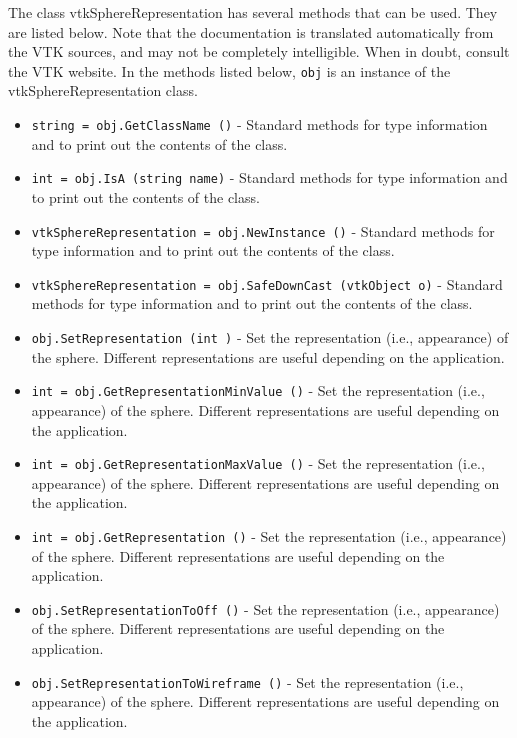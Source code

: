 The class vtkSphereRepresentation has several methods that can be used.
  They are listed below.
Note that the documentation is translated automatically from the VTK sources,
and may not be completely intelligible.  When in doubt, consult the VTK website.
In the methods listed below, \verb|obj| is an instance of the vtkSphereRepresentation class.
\begin{itemize}
\item  \verb|string = obj.GetClassName ()| -  Standard methods for type information and to print out the contents of the class.

\item  \verb|int = obj.IsA (string name)| -  Standard methods for type information and to print out the contents of the class.

\item  \verb|vtkSphereRepresentation = obj.NewInstance ()| -  Standard methods for type information and to print out the contents of the class.

\item  \verb|vtkSphereRepresentation = obj.SafeDownCast (vtkObject o)| -  Standard methods for type information and to print out the contents of the class.

\item  \verb|obj.SetRepresentation (int )| -  Set the representation (i.e., appearance) of the sphere. Different
 representations are useful depending on the application. 

\item  \verb|int = obj.GetRepresentationMinValue ()| -  Set the representation (i.e., appearance) of the sphere. Different
 representations are useful depending on the application. 

\item  \verb|int = obj.GetRepresentationMaxValue ()| -  Set the representation (i.e., appearance) of the sphere. Different
 representations are useful depending on the application. 

\item  \verb|int = obj.GetRepresentation ()| -  Set the representation (i.e., appearance) of the sphere. Different
 representations are useful depending on the application. 

\item  \verb|obj.SetRepresentationToOff ()| -  Set the representation (i.e., appearance) of the sphere. Different
 representations are useful depending on the application. 

\item  \verb|obj.SetRepresentationToWireframe ()| -  Set the representation (i.e., appearance) of the sphere. Different
 representations are useful depending on the application. 


\end{itemize}
